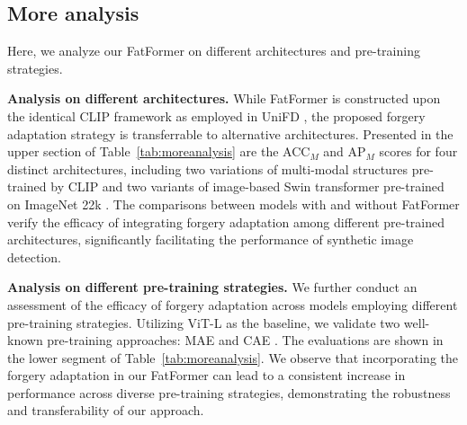 \documentclass[10pt,twocolumn,letterpaper]{article}
\begin{document}
\subsection{More analysis}
Here, we analyze our FatFormer on different architectures and pre-training strategies.

\noindent \textbf{Analysis on different architectures.}
While FatFormer is constructed upon the identical CLIP framework \cite{radford2021learning} as employed in UniFD \cite{ojha2023towards}, the proposed forgery adaptation strategy is transferrable to alternative architectures.
Presented in the upper section of Table~\ref{tab:moreanalysis} are the ACC$_M$ and AP$_M$ scores for four distinct architectures, including two variations of multi-modal structures pre-trained by CLIP and two variants of image-based Swin transformer \cite{liu2021Swin} pre-trained on ImageNet 22k \cite{deng2009imagenet}.
The comparisons between models with and without FatFormer verify the efficacy of integrating forgery adaptation among different pre-trained architectures, significantly facilitating the performance of synthetic image detection.

\noindent \textbf{Analysis on different pre-training strategies.} 
We further conduct an assessment of the efficacy of forgery adaptation across models employing different pre-training strategies. 
Utilizing ViT-L \cite{dosovitskiy2020image} as the baseline, we validate two well-known pre-training approaches: MAE \cite{he2022masked} and CAE \cite{chen2023context}.
The evaluations are shown in the lower segment of Table~\ref{tab:moreanalysis}. 
We observe that incorporating the forgery adaptation in our FatFormer can lead to a consistent increase in performance across diverse pre-training strategies, demonstrating the robustness and transferability of our approach.
\end{document}
